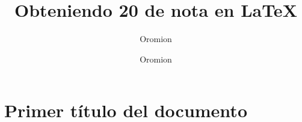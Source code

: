 \documentclass{oromion}
\title{Obteniendo 20 de nota en \LaTeX{}}
\author{Oromion}
\subtitle[Aproximación desde la teoría de estabilidad de ecuaciones diferenciales ordinarias]
\author{Oromion}
\begin{document}
\maketitle
\section{Primer título del documento}
\lipsum[1]
\end{document}
